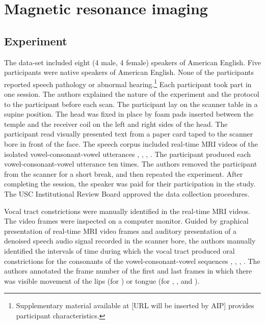 \documentclass[reprint]{JASAnew}\usepackage[]{graphicx}\usepackage[]{color}
\begin{document}
\section{Magnetic resonance imaging}
\label{sec:mri}

\subsection{Experiment}

The data-set included eight (4 male, 4 female) speakers of American English. Five participants were native speakers of American English. None of the participants reported speech pathology or abnormal hearing.\footnote{Supplementary material available at [URL will be inserted by AIP] provides participant characteristics.} Each participant took part in one session. The authors explained the nature of the experiment and the protocol to the participant before each scan. The participant lay on the scanner table in a supine position. The head was fixed in place by foam pads inserted between the temple and the receiver coil on the left and right sides of the head. The participant read visually presented text from a paper card taped to the scanner bore in front of the face. The speech corpus included real-time MRI videos of the isolated vowel-consonant-vowel utterances \textipa{[apa]}, \textipa{[ata]}, \textipa{[aka]}, \textipa{[aja]}. The participant produced each vowel-consonant-vowel utterance ten times. The authors removed the participant from the scanner for a short break, and then repeated the experiment. After completing the session, the speaker was paid for their participation in the study. The USC Institutional Review Board approved the data collection procedures. 

Vocal tract constrictions were manually identified in the real-time MRI videos. 
%
The video frames were inspected on a computer monitor. 
%
Guided by graphical presentation of real-time MRI video frames and auditory presentation of a denoised speech audio signal recorded in the scanner bore, the authors manually identified the intervals of time during which the vocal tract produced oral constrictions for the consonants of the vowel-consonant-vowel sequences \textipa{[apa]}, \textipa{[ata]}, \textipa{[aka]}, \textipa{[aja]}. 
%
The authors annotated the frame number of the first and last frames in which there was visible movement of the lips (for \textipa{[apa]}) or tongue (for \textipa{[ata]}, \textipa{[aka]}, and \textipa{[aja]}). 
\end{document}
